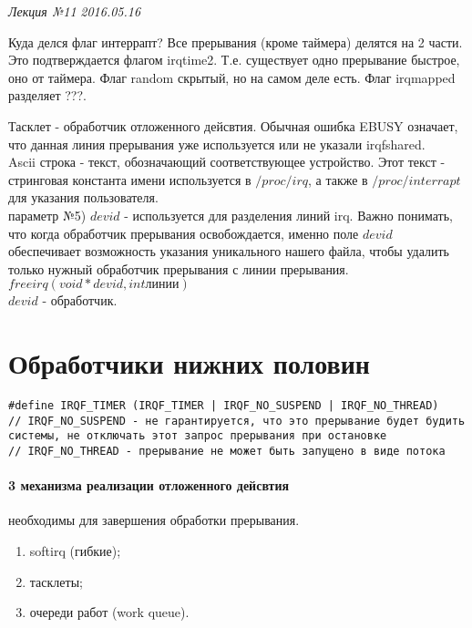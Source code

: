 \clearpage
\begin{flushright}
	\textit{Лекция №11}
	\textit{2016.05.16}
\end{flushright}

Куда делся флаг интеррапт? Все прерывания (кроме таймера) делятся на 2 части. Это подтверждается флагом irqtime2. Т.е. существует одно прерывание быстрое, оно от таймера. Флаг random скрытый, но на самом деле есть.  Флаг irqmapped разделяет ???.

Тасклет - обработчик отложенного дейсвтия. 
Обычная ошибка EBUSY означает, что данная линия прерывания уже используется или не указали irqfshared. \\
Ascii строка - текст, обозначающий соответствующее устройство. Этот текст - стринговая константа имени используется в $/proc/irq$, а также в $/proc/interrapt$ для указания пользователя.\\
параметр №5) $devid$ - используется для разделения линий irq. Важно понимать, что когда обработчик прерывания освобождается, именно поле $devid$ обеспечивает возможность указания уникального нашего файла, чтобы удалить только нужный обработчик прерывания с линии прерывания.
$freeirq(void *devid, int \text{линии})$\\
$devid$ - обработчик.

 

\section{Обработчики нижних половин}

\begin{lstlisting}
#define IRQF_TIMER (IRQF_TIMER | IRQF_NO_SUSPEND | IRQF_NO_THREAD)
// IRQF_NO_SUSPEND - не гарантируется, что это прерывание будет будить системы, не отключать этот запрос прерывания при остановке
// IRQF_NO_THREAD - прерывание не может быть запущено в виде потока
\end{lstlisting}

\paragraph{3 механизма реализации отложенного дейсвтия} необходимы для завершения обработки прерывания.
\begin{enumerate}
	\item softirq (гибкие);
	\item тасклеты;
	\item очереди работ (work queue).
\end{enumerate}	

